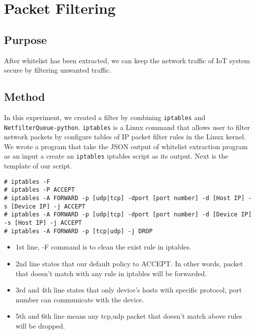 
\section{Packet Filtering}
\subsection{Purpose}
After whitelist has been extracted, we can keep the network traffic of IoT system secure by filtering unwanted traffic.  

\subsection{Method} 
 
In this experiment, we created a filter by combining 
\colorbox{white}{\lstinline[basicstyle=\ttfamily\color{black}]|iptables|} and 
\colorbox{white}{\lstinline[basicstyle=\ttfamily\color{black}]|NetfilterQueue-python|}. 
\colorbox{white}{\lstinline[basicstyle=\ttfamily\color{black}]|iptables|} is a Linux command that allows user to filter network packets by configure tables of IP packet filter rules in the Linux kernel. We wrote a program that take the JSON output of whitelist extraction program as an input a create an 
\colorbox{white}{\lstinline[basicstyle=\ttfamily\color{black}]|iptables|}
iptables script as its output. Next is the template of our script.
\\

\begin{lstlisting}[label=sh]
# iptables -F  
# iptables -P ACCEPT
# iptables -A FORWARD -p [udp|tcp] -dport [port number] -d [Host IP] -s [Device IP] -j ACCEPT 
# iptables -A FORWARD -p [udp|tcp] -dport [port number] -d [Device IP] -s [Host IP] -j ACCEPT
# iptables -A FORWARD -p [tcp|udp] -j DROP 
\end{lstlisting}

\begin{itemize}
    \item 1st line, -F command is to clean the exist rule in iptables. 
    \item 2nd line states that our default policy to ACCEPT. In other words, packet that doesn't match with any rule in iptables will be forwarded.
    \item 3rd and 4th line states that only device’s hosts with specific protocol, port number can communicate with the device.
    \item 5th and 6th line means any tcp,udp packet that doesn't match above rules will be dropped.
\end{itemize}

